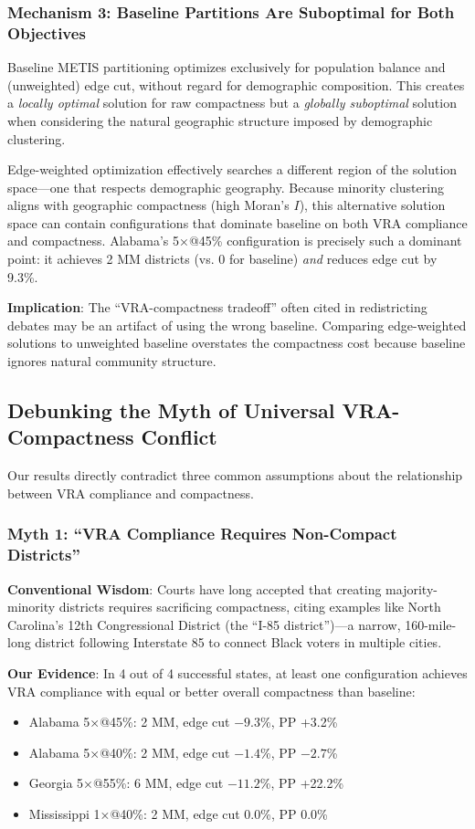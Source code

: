 \subsubsection{Mechanism 3: Baseline Partitions Are Suboptimal for Both Objectives}

Baseline METIS partitioning optimizes exclusively for population balance and (unweighted) edge cut, without regard for demographic composition. This creates a \emph{locally optimal} solution for raw compactness but a \emph{globally suboptimal} solution when considering the natural geographic structure imposed by demographic clustering.

Edge-weighted optimization effectively searches a different region of the solution space---one that respects demographic geography. Because minority clustering aligns with geographic compactness (high Moran's $I$), this alternative solution space can contain configurations that dominate baseline on both VRA compliance and compactness. Alabama's 5×@45\% configuration is precisely such a dominant point: it achieves 2 MM districts (vs. 0 for baseline) \emph{and} reduces edge cut by 9.3\%.

\textbf{Implication}: The ``VRA-compactness tradeoff'' often cited in redistricting debates may be an artifact of using the wrong baseline. Comparing edge-weighted solutions to unweighted baseline overstates the compactness cost because baseline ignores natural community structure.

\subsection{Debunking the Myth of Universal VRA-Compactness Conflict}

Our results directly contradict three common assumptions about the relationship between VRA compliance and compactness.

\subsubsection{Myth 1: ``VRA Compliance Requires Non-Compact Districts''}

\textbf{Conventional Wisdom}: Courts have long accepted that creating majority-minority districts requires sacrificing compactness, citing examples like North Carolina's 12th Congressional District (the ``I-85 district'')---a narrow, 160-mile-long district following Interstate 85 to connect Black voters in multiple cities.

\textbf{Our Evidence}: In 4 out of 4 successful states, at least one configuration achieves VRA compliance with equal or better overall compactness than baseline:
\begin{itemize}
    \item Alabama 5×@45\%: 2 MM, edge cut $-9.3$\%, PP +3.2\%
    \item Alabama 5×@40\%: 2 MM, edge cut $-1.4$\%, PP $-2.7$\%
    \item Georgia 5×@55\%: 6 MM, edge cut $-11.2$\%, PP +22.2\%
    \item Mississippi 1×@40\%: 2 MM, edge cut 0.0\%, PP 0.0\%
\end{itemize}


